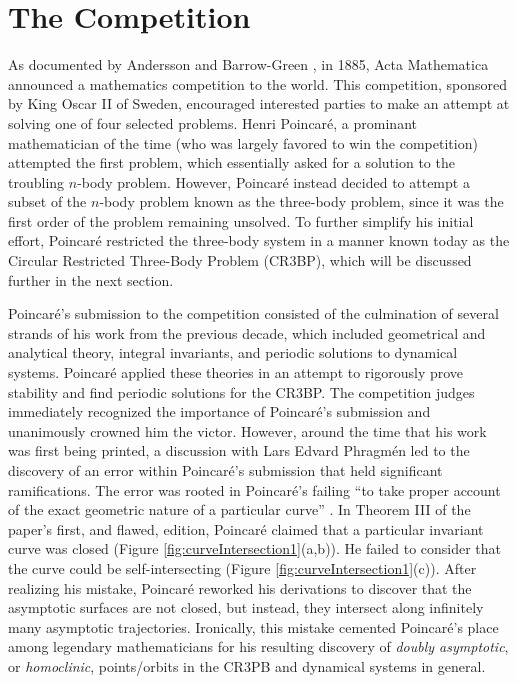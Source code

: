 \documentclass[11pt]{article} %
\begin{document}
\section*{The Competition}
As documented by Andersson and Barrow-Green \cite{Andersson1994,BarrowGreen1994}, in 1885, Acta Mathematica announced a mathematics competition to the world. This competition, sponsored by King Oscar II of Sweden, encouraged interested parties to make an attempt at solving one of four selected problems. Henri Poincaré, a prominant mathematician of the time (who was largely favored to win the competition) attempted the first problem, which essentially asked for a solution to the troubling $n$-body problem. However, Poincaré instead decided to attempt a subset of the $n$-body problem known as the three-body problem, since it was the first order of the problem remaining unsolved. To further simplify his initial effort, Poincaré restricted the three-body system in a manner known today as the Circular Restricted Three-Body Problem (CR3BP), which will be discussed further in the next section.

Poincaré's submission to the competition consisted of the culmination of several strands of his work from the previous decade, which included geometrical and analytical theory, integral invariants, and periodic solutions to dynamical systems. Poincaré applied these theories in an attempt to rigorously prove stability and find periodic solutions for the CR3BP. The competition judges immediately recognized the importance of Poincaré's submission and unanimously crowned him the victor. However, around the time that his work was first being printed, a discussion with Lars Edvard Phragmén led to the discovery of an error within Poincaré's submission that held significant ramifications. The error was rooted in Poincaré's failing ``to take proper account of the exact geometric nature of a particular curve'' \cite{BarrowGreen1997}. In Theorem III of the paper's first, and flawed, edition, Poincaré claimed that a particular invariant curve was closed (Figure \ref{fig:curveIntersection1}(a,b)). He failed to consider that the curve could be self-intersecting (Figure \ref{fig:curveIntersection1}(c)). After realizing his mistake, Poincaré reworked his derivations to discover that the asymptotic surfaces are not closed, but instead, they intersect along infinitely many asymptotic trajectories. Ironically, this mistake cemented Poincaré's place among legendary mathematicians for his resulting discovery of \textit{doubly asymptotic}, or \textit{homoclinic}, points/orbits in the CR3PB and dynamical systems in general.  
\end{document}
